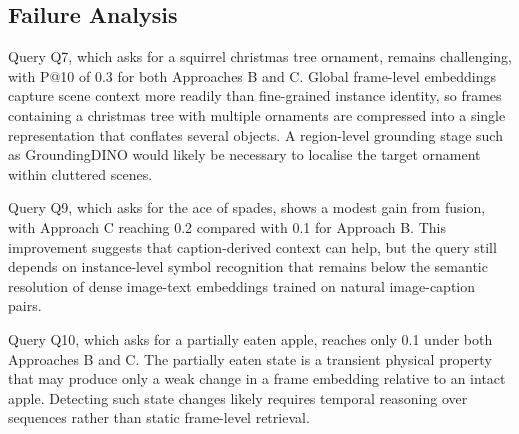 \subsection{Failure Analysis}
\label{sec:failure}

Query Q7, which asks for a squirrel christmas tree ornament, remains challenging, with P@10 of 0.3 for both Approaches B and C. Global frame-level embeddings capture scene context more readily than fine-grained instance identity, so frames containing a christmas tree with multiple ornaments are compressed into a single representation that conflates several objects. A region-level grounding stage such as GroundingDINO \cite{liu2024groundingdino} would likely be necessary to localise the target ornament within cluttered scenes.

Query Q9, which asks for the ace of spades, shows a modest gain from fusion, with Approach C reaching 0.2 compared with 0.1 for Approach B. This improvement suggests that caption-derived context can help, but the query still depends on instance-level symbol recognition that remains below the semantic resolution of dense image-text embeddings trained on natural image-caption pairs.

Query Q10, which asks for a partially eaten apple, reaches only 0.1 under both Approaches B and C. The partially eaten state is a transient physical property that may produce only a weak change in a frame embedding relative to an intact apple. Detecting such state changes likely requires temporal reasoning over sequences rather than static frame-level retrieval.
